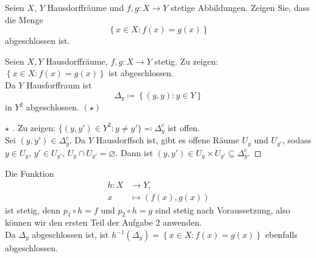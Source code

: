 \begin{assignment}
  Seien \( X \), \( Y \) Hausdorffräume und \( f,g : X \to Y \) stetige Abbildungen. Zeigen Sie, dass die Menge
  \begin{equation*}
    \left \{ x \in X : f(x) = g(x) \right \}
  \end{equation*}
  abgeschlossen ist.
\end{assignment}
\begin{solution}
  Seien \( X, Y \) Hausdorffräume, \( f,g : X \to Y \) stetig. Zu zeigen: \( \left \{ x \in X : f(x) = g(x) \right \} \) ist abgeschlossen. \\
  Da \( Y \) Hausforffraum ist
  \begin{equation*}
    \Delta_y \coloneqq \left \{ (y,y): y \in Y \right \}
  \end{equation*}
  in \( Y^2 \) abgeschlossen. \( (\star) \) 
  \begin{proof}[ \( \star \) ]
    Zu zeigen: \( \{ (y, y') \in Y^2 : y \neq y' \} \eqqcolon \Delta_y^c \) ist offen. \\
    Sei \( (y,y') \in \Delta_y^c \). Da \( Y \) Hausdorffsch ist, gibt es offene Räume \( U_y \) und \( U_{y'} \), sodass \( y \in U_y \), \( y' \in U_{y'} \), \( U_y \cap U_{y'} = \varnothing \). Dann ist \( (y, y') \in U_y \times U_{y'} \subseteq \Delta_y^c \).
  \end{proof}
  Die Funktion
  \begin{align*}
    h : X &\to Y\text{,} \\
    x &\mapsto (f(x), g(x))
  \end{align*}
  ist stetig, denn \( p_1 \circ h = f \) und \( p_2 \circ h = g \) sind stetig nach Voraussetzung, also können wir den ersten Teil der Aufgabe 2 anwenden. \\
  Da \( \Delta_y \) abgeschlossen ist, ist \( h^{-1}(\Delta_y) = \left \{ x \in X : f(x) = g(x) \right \} \) ebenfalls abgeschlossen.
\end{solution}


